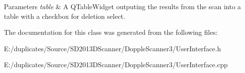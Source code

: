 \begin{DoxyParams}{Parameters}
{\em table} & A Q\-Table\-Widget outputing the results from the scan into a table with a checkbox for deletion select. \\
\hline
\end{DoxyParams}


The documentation for this class was generated from the following files\-:\begin{DoxyCompactItemize}
\item 
E\-:/duplicates/\-Source/\-S\-D2013\-D\-Scanner/\-Dopple\-Scanner3/User\-Interface.\-h\item 
E\-:/duplicates/\-Source/\-S\-D2013\-D\-Scanner/\-Dopple\-Scanner3/User\-Interface.\-cpp\end{DoxyCompactItemize}
